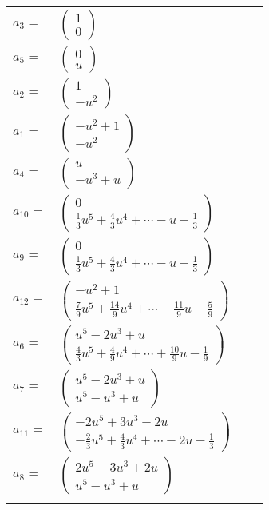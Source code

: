\documentclass[1p]{elsarticle_modified}
\theoremstyle{definition}
\begin{document}
\begin{tabular}{m{7pt} m{180pt} m{7pt} m{180pt} }
\flushright $a_{3}=$&$\begin{pmatrix}1\\0\end{pmatrix}$ \\
\flushright $a_{5}=$&$\begin{pmatrix}0\\u\end{pmatrix}$ \\
\flushright $a_{2}=$&$\begin{pmatrix}1\\- u^2\end{pmatrix}$ \\
\flushright $a_{1}=$&$\begin{pmatrix}- u^2+1\\- u^2\end{pmatrix}$ \\
\flushright $a_{4}=$&$\begin{pmatrix}u\\- u^3+u\end{pmatrix}$ \\
\flushright $a_{10}=$&$\begin{pmatrix}0\\\frac{1}{3} u^5+\frac{4}{3} u^4+\cdots- u-\frac{1}{3}\end{pmatrix}$ \\
\flushright $a_{9}=$&$\begin{pmatrix}0\\\frac{1}{3} u^5+\frac{4}{3} u^4+\cdots- u-\frac{1}{3}\end{pmatrix}$ \\
\flushright $a_{12}=$&$\begin{pmatrix}- u^2+1\\\frac{7}{9} u^5+\frac{14}{9} u^4+\cdots-\frac{11}{9} u-\frac{5}{9}\end{pmatrix}$ \\
\flushright $a_{6}=$&$\begin{pmatrix}u^5-2 u^3+u\\\frac{4}{3} u^5+\frac{4}{9} u^4+\cdots+\frac{10}{9} u-\frac{1}{9}\end{pmatrix}$ \\
\flushright $a_{7}=$&$\begin{pmatrix}u^5-2 u^3+u\\u^5- u^3+u\end{pmatrix}$ \\
\flushright $a_{11}=$&$\begin{pmatrix}-2 u^5+3 u^3-2 u\\-\frac{2}{3} u^5+\frac{4}{3} u^4+\cdots-2 u-\frac{1}{3}\end{pmatrix}$ \\
\flushright $a_{8}=$&$\begin{pmatrix}2 u^5-3 u^3+2 u\\u^5- u^3+u\end{pmatrix}$\\&\end{tabular}
\end{document}
